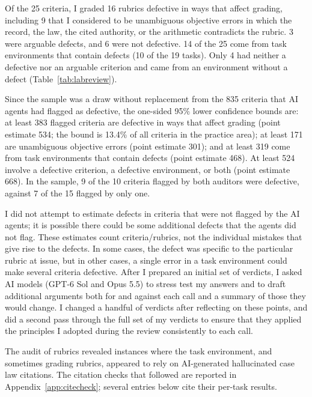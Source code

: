 \documentclass[11pt]{article}
\newcommand{\labFlagged}{835}
\newcommand{\labSample}{25}
\newcommand{\labSampleTasks}{19}
\newcommand{\labDefective}{16}
\newcommand{\labArguable}{3}
\newcommand{\labNotDefective}{6}
\newcommand{\labObjective}{9}
\newcommand{\labEnvItems}{14}
\newcommand{\labEnvTasks}{10}
\newcommand{\labNoDefect}{4}
\newcommand{\labBothFlagged}{10}
\newcommand{\labBothDefective}{9}
\newcommand{\labSingleFlagged}{15}
\newcommand{\labSingleDefective}{7}
\newcommand{\labDefectiveLB}{383}
\newcommand{\labDefectivePoint}{534}
\newcommand{\labDefectiveShare}{13.4}
\newcommand{\labObjectiveLB}{171}
\newcommand{\labObjectivePoint}{301}
\newcommand{\labEnvLB}{319}
\newcommand{\labEnvPoint}{468}
\newcommand{\labAnyLB}{524}
\newcommand{\labAnyPoint}{668}
\begin{document}
Of the \labSample{} criteria, I graded \labDefective{} rubrics defective in ways that affect grading, including \labObjective{} that I considered to be unambiguous objective errors in which the record, the law, the cited authority, or the arithmetic contradicts the rubric. \labArguable{} were arguable defects, and \labNotDefective{} were not defective. \labEnvItems{} of the \labSample{} come from task environments that contain defects (\labEnvTasks{} of the \labSampleTasks{} tasks). Only \labNoDefect{} had neither a defective nor an arguable criterion and came from an environment without a defect (Table~\ref{tab:labreview}).

Since the sample was a draw without replacement from the \labFlagged{} criteria that AI agents had flagged as defective, the one-sided 95\% lower confidence bounds are: at least \labDefectiveLB{} flagged criteria are defective in ways that affect grading (point estimate \labDefectivePoint{}; the bound is \labDefectiveShare\% of all criteria in the practice area); at least \labObjectiveLB{} are unambiguous objective errors (point estimate \labObjectivePoint{}); and at least \labEnvLB{} come from task environments that contain defects (point estimate \labEnvPoint{}). At least \labAnyLB{} involve a defective criterion, a defective environment, or both (point estimate \labAnyPoint{}). In the sample, \labBothDefective{} of the \labBothFlagged{} criteria flagged by both auditors were defective, against \labSingleDefective{} of the \labSingleFlagged{} flagged by only one.

I did not attempt to estimate defects in criteria that were not flagged by the AI agents; it is possible there could be some additional defects that the agents did not flag. These estimates count criteria/rubrics, not the individual mistakes that give rise to the defects. In some cases, the defect was specific to the particular rubric at issue, but in other cases, a single error in a task environment could make several criteria defective. After I prepared an initial set of verdicts, I asked AI models (GPT-6 Sol and Opus 5.5) to stress test my answers and to draft additional arguments both for and against each call and a summary of those they would change. I changed a handful of verdicts after reflecting on these points, and did a second pass through the full set of my verdicts to ensure that they applied the principles I adopted during the review consistently to each call.

The audit of rubrics revealed instances where the task environment, and sometimes grading rubrics, appeared to rely on AI-generated hallucinated case law citations. The citation checks that followed are reported in Appendix~\ref{app:citecheck}; several entries below cite their per-task results.
\end{document}

